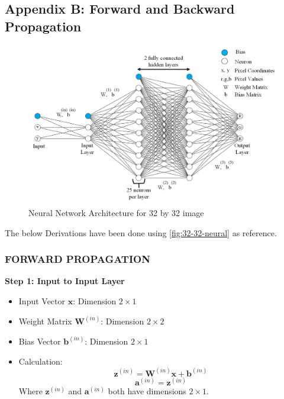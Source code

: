 \documentclass{ioereport}
\begin{document}
\pagebreak

\subsection*{Appendix B: Forward and Backward Propagation}
\label{app:forward-backward-eqn}

\begin{figure}[H]
    \centering
    \includegraphics[width=\linewidth]{assets/32_32_neural.png}
    \caption{Neural Network Architecture for 32 by 32 image}
    \label{fig:32-32-neural}
\end{figure}

The below Derivations have been done using \autoref{fig:32-32-neural} as reference.
\subsubsection*{\MakeUppercase{Forward Propagation}}
\textbf{Step 1: Input to Input Layer}
\begin{itemize}
  \item Input Vector $\mathbf{x}$: Dimension $2 \times 1$
  \item Weight Matrix $\mathbf{W}^{(in)}$: Dimension $2 \times 2$
  \item Bias Vector $\mathbf{b}^{(in)}$: Dimension $2 \times 1$
  \item Calculation:
  \[
  \mathbf{z}^{(in)} = \mathbf{W}^{(in)} \mathbf{x} + \mathbf{b}^{(in)}
  \]
  \[
  \mathbf{a}^{(in)} = \mathbf{z}^{(in)}
  \]
  Where $\mathbf{z}^{(in)}$ and $\mathbf{a}^{(in)}$ both have dimensions $2 \times 1$.
\end{itemize}
\end{document}
